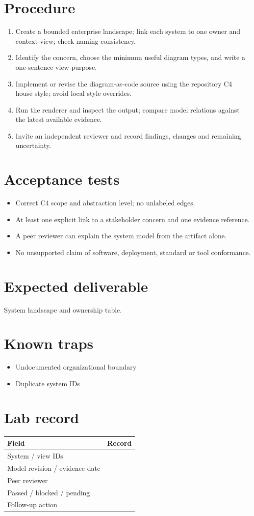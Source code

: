 \documentclass[10pt,letterpaper]{article}
\begin{document}
\section{Procedure}
\begin{enumerate}
\item Create a bounded enterprise landscape; link each system to one owner and context view; check naming consistency.
\item Identify the concern, choose the minimum useful diagram types, and write a one-sentence view purpose.
\item Implement or revise the diagram-as-code source using the repository C4 house style; avoid local style overrides.
\item Run the renderer and inspect the output; compare model relations against the latest available evidence.
\item Invite an independent reviewer and record findings, changes and remaining uncertainty.
\end{enumerate}

\section{Acceptance tests}
\begin{itemize}
\item Correct C4 scope and abstraction level; no unlabeled edges.
\item At least one explicit link to a stakeholder concern and one evidence reference.
\item A peer reviewer can explain the system model from the artifact alone.
\item No unsupported claim of software, deployment, standard or tool conformance.
\end{itemize}

\section{Expected deliverable}
System landscape and ownership table.


\section{Known traps}
\begin{itemize}
\item Undocumented organizational boundary
\item Duplicate system IDs
\end{itemize}

\section{Lab record}
\begin{tabularx}{\linewidth}{@{}YY@{}}\toprule
\textbf{Field} & \textbf{Record} \\ \midrule
System / view IDs &  \\
Model revision / evidence date &  \\
Peer reviewer &  \\
Passed / blocked / pending &  \\
Follow-up action &  \\
\bottomrule\end{tabularx}
\end{document}
